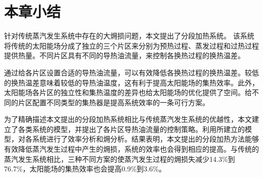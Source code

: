 \section{本章小结}

针对传统蒸汽发生系统中存在的大㶲损问题，本文提出了分段加热系统。
该系统将传统的太阳能场分成了独立的三个片区来分别为预热过程、蒸发过程和过热过程提供热量。不同片区具有不同的导热油流量，来控制各换热过程的换热温差。

通过给各片区设置合适的导热油流量，可以有效降低各换热过程的换热温差。较低的换热温差意味着较低的导热油温度，这有利于提高太阳能场的集热效率。此外，太阳能场各片区的独立性和集热温度的差异也给太阳能场的优化提供了空间。给不同的片区配置不同类型的集热器是提高系统效率的一条可行方案。

为了精确描述本文提出的分段加热系统相比与传统蒸汽发生系统的优越性，本文建立了各类系统的模型，并提出了各片区导热油流量的控制策略。利用所建立的模型，对各系统进行了效率分析和㶲分析。结果表明，本文提出的分段加热方法能够有效降低蒸汽发生过程中产生的㶲损，系统的效率也会得到相应的提高。与传统的蒸汽发生系统相比，三种不同方案的使蒸汽发生过程的㶲损失减少14.3\%到76.7\%，太阳能场的集热效率也会提高0.9\%到3.6\%。